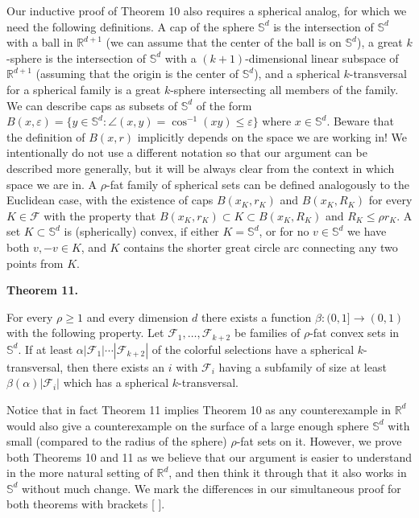 Our inductive proof of Theorem 10 also requires a spherical analog, for which we need the following definitions. A cap of the sphere $\mathbb{S}^{d}$ is the intersection of $\mathbb{S}^{d}$ with a ball in $\mathbb{R}^{d+1}$ (we can assume that the center of the ball is on $\mathbb{S}^{d}$), a great $k$-sphere is the intersection of $\mathbb{S}^{d}$ with a $(k+1)$-dimensional linear subspace of $\mathbb{R}^{d+1}$ (assuming that the origin is the center of $\mathbb{S}^{d}$), and a spherical $k$-transversal for a spherical family is a great $k$-sphere intersecting all members of the family. We can describe caps as subsets of $\mathbb{S}^{d}$ of the form $B(x,\varepsilon)=\{y\in\mathbb{S}^{d}:\angle(x,y)=\cos^{-1}(xy)\leq\varepsilon\}$ where $x\in\mathbb{S}^{d}$. Beware that the definition of $B(x,r)$ implicitly depends on the space we are working in! We intentionally do not use a different notation so that our argument can be described more generally, but it will be always clear from the context in which space we are in. A $\rho$-fat family of spherical sets can be defined analogously to the Euclidean case, with the existence of caps $B(x_{K},r_{K})$ and $B(x_{K},R_{K})$ for every $K\in\mathcal{F}$ with the property that $B(x_{K},r_{K})\subset K\subset B(x_{K},R_{K})$ and $R_{K}\leq\rho r_{K}$. A set $K\subset\mathbb{S}^{d}$ is (spherically) convex, if either $K=\mathbb{S}^{d}$, or for no $v\in\mathbb{S}^{d}$ we have both $v,-v\in K$, and $K$ contains the shorter great circle arc connecting any two points from $K$.
\par
\par
\par\medskip\noindent\textbf{Theorem 11.}\par
For every $\rho\geq 1$ and every dimension $d$ there exists a function $\beta:(0,1]\to(0,1)$ with the following property. Let $\mathcal{F}_{1},\ldots,\mathcal{F}_{k+2}$ be families of $\rho$-fat convex sets in $\mathbb{S}^{d}$. If at least $\alpha|\mathcal{F}_{1}|\cdots|\mathcal{F}_{k+2}|$ of the colorful selections have a spherical $k$-transversal, then there exists an $i$ with $\mathcal{F}_{i}$ having a subfamily of size at least $\beta(\alpha)|\mathcal{F}_{i}|$ which has a spherical $k$-transversal.
\par
\par
\par
Notice that in fact Theorem 11 implies Theorem 10 as any counterexample in $\mathbb{R}^{d}$ would also give a counterexample on the surface of a large enough sphere $\mathbb{S}^{d}$ with small (compared to the radius of the sphere) $\rho$-fat sets on it. However, we prove both Theorems 10 and 11 as we believe that our argument is easier to understand in the more natural setting of $\mathbb{R}^{d}$, and then think it through that it also works in $\mathbb{S}^{d}$ without much change. We mark the differences in our simultaneous proof for both theorems with brackets [ ].

